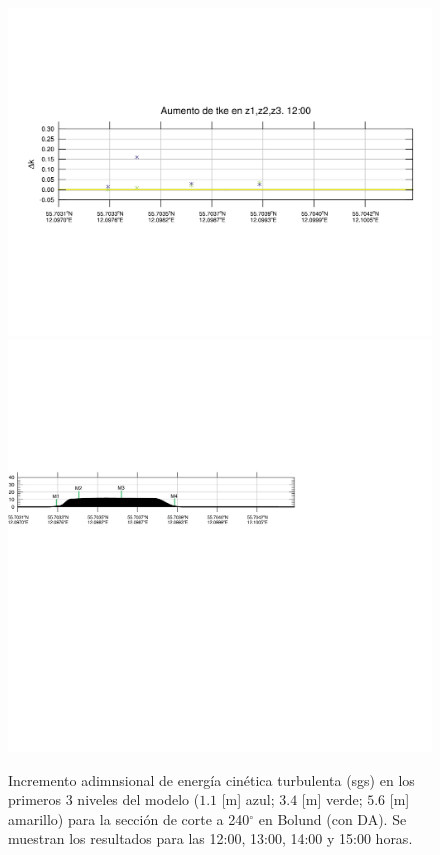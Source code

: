 \begin{figure}[H]
	\includegraphics[width=0.90\linewidth,trim={12mm 84mm 10mm 74mm},page=37,clip]{Imagenes/06/bol_da/delta_tke}\\%
	\includegraphics[width=0.90\linewidth,trim={-13.3mm 193mm 115mm 112mm},clip]{Imagenes/06/bol_da/cross_height}\\%
	\caption{Incremento adimnsional de energía cinética turbulenta (sgs) en los primeros 3 niveles del modelo ($1.1$ [m] azul; $3.4$ [m] verde; $5.6$ [m] amarillo) para la sección de corte a 240$^\circ$ en Bolund (con DA). Se muestran los resultados para las 12:00, 13:00, 14:00 y 15:00 horas.}
	\label{fig:06_bol_da_tke}
\end{figure}
